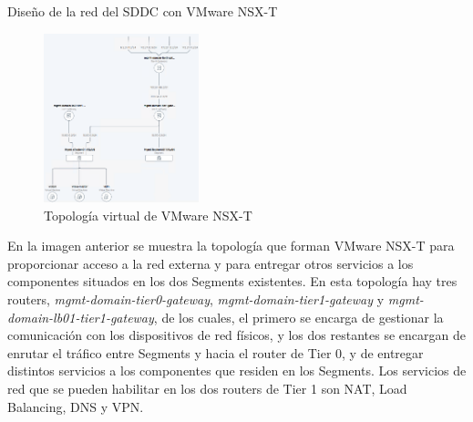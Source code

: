 \begin{subsubsection}{Diseño de la red del SDDC con VMware NSX-T}
    \begin{figure}[h]
        \centering
        \includegraphics[width=0.4\textwidth]{imaxes/pruebaconcepto/topologiaTwoTierRouting-Final.png}
        \caption{Topología virtual de VMware NSX-T}
        \label{fig:two-tier-topology} 
    \end{figure}
    \FloatBarrier
    En la imagen anterior se muestra la topología que forman VMware NSX-T para proporcionar acceso a la red externa y para entregar otros servicios a los componentes situados en los dos Segments existentes. En esta topología hay tres routers, \textit{mgmt-domain-tier0-gateway}, \textit{mgmt-domain-tier1-gateway} y \textit{mgmt-domain-lb01-tier1-gateway}, de los cuales, el primero se encarga de gestionar la comunicación con los dispositivos de red físicos, y los dos restantes se encargan de enrutar el tráfico entre Segments y hacia el router de Tier 0, y de entregar distintos servicios a los componentes que residen en los Segments. Los servicios de red que se pueden habilitar en los dos routers de Tier 1 son NAT, Load Balancing, DNS y VPN.
\end{subsubsection}